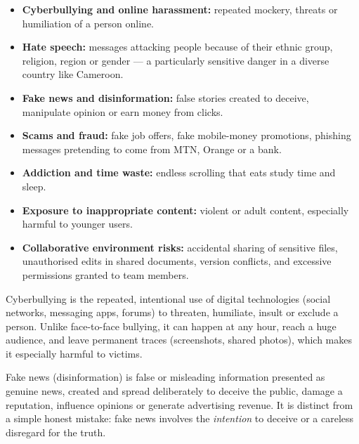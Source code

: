 \documentclass[11pt]{article}
\newcommand{\cle}[1]{{\popxbold\color{popdark}#1}}
\begin{document}
\begin{itemize}
\item \textbf{Cyberbullying and online harassment:} repeated mockery, threats or humiliation of a person online.
\item \textbf{Hate speech:} messages attacking people because of their ethnic group, religion, region or gender --- a particularly sensitive danger in a diverse country like Cameroon.
\item \textbf{Fake news and disinformation:} false stories created to deceive, manipulate opinion or earn money from clicks.
\item \textbf{Scams and fraud:} fake job offers, fake mobile-money promotions, phishing messages pretending to come from MTN, Orange or a bank.
\item \textbf{Addiction and time waste:} endless scrolling that eats study time and sleep.
\item \textbf{Exposure to inappropriate content:} violent or adult content, especially harmful to younger users.
\item \textbf{Collaborative environment risks:} accidental sharing of sensitive files, unauthorised edits in shared documents, version conflicts, and excessive permissions granted to team members.
\end{itemize}

\begin{definition}[Cyberbullying]
\cle{Cyberbullying} is the repeated, intentional use of digital technologies (social networks, messaging apps, forums) to threaten, humiliate, insult or exclude a person. Unlike face-to-face bullying, it can happen at any hour, reach a huge audience, and leave permanent traces (screenshots, shared photos), which makes it especially harmful to victims.
\end{definition}

\begin{definition}
\cle{Fake news} (disinformation) is false or misleading information presented as genuine news, created and spread deliberately to deceive the public, damage a reputation, influence opinions or generate advertising revenue. It is distinct from a simple honest mistake: fake news involves the \emph{intention} to deceive or a careless disregard for the truth.
\end{definition}
\end{document}
